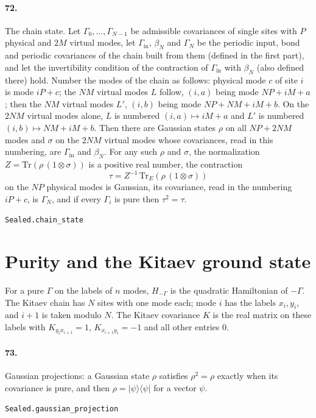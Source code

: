 \documentclass[11pt]{article}
\begin{document}
\paragraph{72.} The chain state. Let $\Gamma_0, \dots, \Gamma_{N-1}$ be admissible covariances of single sites with $P$ physical and $2M$ virtual modes, let $\Gamma_{\mathrm{in}}$, $\beta_N$ and $\Gamma_N$ be the periodic input, bond and periodic covariances of the chain built from them (defined in the first part), and let the invertibility condition of the contraction of $\Gamma_{\mathrm{in}}$ with $\beta_N$ (also defined there) hold. Number the modes of the chain as follows: physical mode $c$ of site $i$ is mode $iP + c$; the $N M$ virtual modes $L$ follow, $(i, a)$ being mode $NP + iM + a$; then the $N M$ virtual modes $L'$, $(i, b)$ being mode $NP + NM + iM + b$. On the $2NM$ virtual modes alone, $L$ is numbered $(i, a) \mapsto iM + a$ and $L'$ is numbered $(i, b) \mapsto NM + iM + b$. Then there are Gaussian states $\rho$ on all $NP + 2NM$ modes and $\sigma$ on the $2NM$ virtual modes whose covariances, read in this numbering, are $\Gamma_{\mathrm{in}}$ and $\beta_N$. For any such $\rho$ and $\sigma$, the normalization $Z = \mathrm{Tr}(\rho\,(1 \otimes \sigma))$ is a positive real number, the contraction \[\tau = Z^{-1}\,\mathrm{Tr}_E(\rho\,(1 \otimes \sigma))\] on the $NP$ physical modes is Gaussian, its covariance, read in the numbering $iP + c$, is $\Gamma_N$, and if every $\Gamma_i$ is pure then $\tau^2 = \tau$.\par{\footnotesize\texttt{Sealed.chain\_state}}

\section*{Purity and the Kitaev ground state}
For a pure $\Gamma$ on the labels of $n$ modes, $H_{-\Gamma}$ is the quadratic Hamiltonian of $-\Gamma$. The Kitaev chain has $N$ sites with one mode each; mode $i$ has the labels $x_i, y_i$, and $i + 1$ is taken modulo $N$. The Kitaev covariance $K$ is the real matrix on these labels with $K_{y_i x_{i+1}} = 1$, $K_{x_{i+1} y_i} = -1$ and all other entries $0$.

\paragraph{73.} Gaussian projections: a Gaussian state $\rho$ satisfies $\rho^2 = \rho$ exactly when its covariance is pure, and then $\rho = |\psi\rangle\langle\psi|$ for a vector $\psi$.\par{\footnotesize\texttt{Sealed.gaussian\_projection}}
\end{document}
